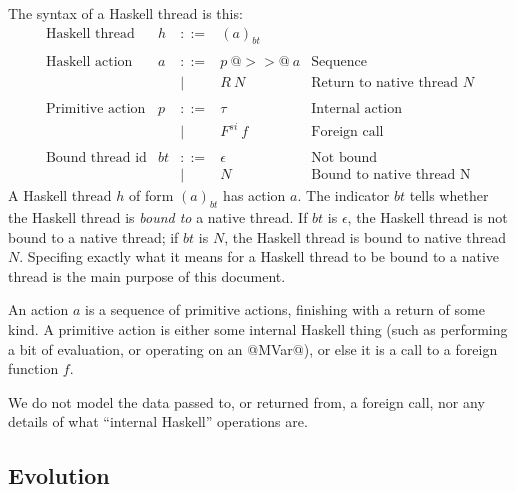 \documentclass{article}
\newcommand{\fcall}[2]{F^{#1}~#2}
\newcommand{\ret}[1]{R~#1}
\begin{document}
The syntax of a Haskell thread is this:
$$
\begin{array}{lrcll}
\mbox{Haskell thread} &  h & ::= & (a)_{bt} \\
\\
\mbox{Haskell action} &  a & ::= & p ~@>>@~ a  & \mbox{Sequence} \\
	& & | & \ret{N}  & \mbox{Return to native thread $N$} \\
\\
\mbox{Primitive action} &  p & ::= & \tau & \mbox{Internal action} \\
	& & | & \fcall{si}{f} & \mbox{Foreign call} \\
\\
\mbox{Bound thread id} & bt & ::= & \epsilon & \mbox{Not bound} \\
	& & | & N & \mbox{Bound to native thread N}
\end{array}
$$
A Haskell thread $h$ of form $(a)_{bt}$ has action $a$.  The indicator
$bt$ tells whether the Haskell thread is \emph{bound to} a native
thread.  If $bt$ is $\epsilon$, the Haskell thread is not bound to a
native thread; if $bt$ is $N$, the Haskell thread is bound to native
thread $N$.  Specifing exactly what it means for a Haskell thread to
be bound to a native thread is the main purpose of this document.

An action $a$ is a sequence of primitive actions, finishing with a 
return of some kind.  A primitive action is either some internal Haskell
thing (such as performing a bit of evaluation, or operating on an @MVar@),
or else it is a call to a foreign function $f$.

We do not model the data passed to, or returned from, a foreign call, nor
any details of what ``internal Haskell'' operations are.  

\subsection{Evolution}
\end{document}
